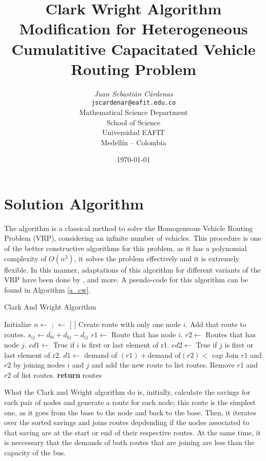 \documentclass[10pt,twoside]{article}
\title{Clark Wright Algorithm Modification for Heterogeneous Cumulatitive Capacitated Vehicle Routing Problem}
\author{\emph{Juan Sebastián Cárdenas}\\
\vspace{0.3cm}
\small{\tt{jscardenar@eafit.edu.co}}\\
Mathematical Science Department\\
School of Science\\
Universidad EAFIT\\
Medellín -- Colombia}
\date{\today}
\begin{document}
\maketitle

\thispagestyle{firststyle}

\section{Solution Algorithm}\label{sec_alg}
The \cite{clarke1964} algorithm is a classical method to solve the
Homogeneous Vehicle Routing Problem (VRP), considering an infinite
number of vehicles. This procedure is one of the
better constructive algorithms for this problem, as it has a
polynomial complexity of $O(n^2)$, it solves the problem
effectively and it is extremely flexible. In this manner, adaptations
of this algorithm for different variants of the VRP have been done by
\cite{golden1984}, \cite{caccetta2013} and more. A pseudo-code for this algorithm can be found in Algorithm \ref{a_cw}.

\begin{algorithm}[H]
\caption{Clark And Wright Algorithm}\label{a_cw}
\begin{algorithmic}[1]
  \State Initialize $n \gets $ ;  $\gets$ [ ]
    \State Create route with only one node $i$. Add that route to routes.
     
       \State $s_{ij} \gets d_{bi} + d_{bj} - d_{ij}$ 
    \EndFor
   \EndFor
   \State {}
      \State $r1 \gets$ Route that has node $i$.
      \State $r2 \gets$ Routes that has node $j$.
      \State $ed1 \gets$ True if $i$ is first or last element of r1.
      \State $ed2 \gets$ True if $j$ is first or last element of r2.
      \State $d1 \gets$ demand of $(r1) + $demand of$(r2) < $ cap
        \State Join $r1$ and $r2$ by joining nodes $i$ and $j$ and add the new route to list routes.
        \State Remove $r1$ and $r2$ of list routes.
      \EndIf 
   \EndFor
   \State \textbf{return} routes
\EndProcedure
\end{algorithmic}
\end{algorithm}

What the Clark and Wright algorithm do is, initially, calculate the
savings for each pair of nodes and generate a route for each node;
this route is the simplest one, as it goes from the base to the node
and back to the base. Then, it iterates over the sorted savings and
joins routes depdending if the nodes associated to that saving are at
the start or end of their respective routes. At the same time, it is
neccessary that the demands of both routes that are joining are less
than the capacity of the bus.
\end{document}
